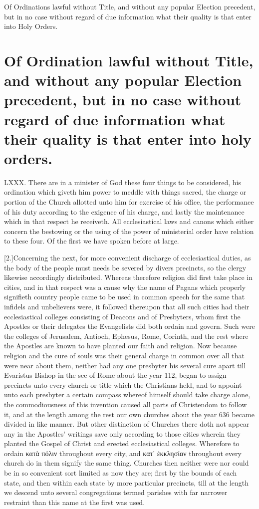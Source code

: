 Of Ordinations lawful without Title, and without any popular Election precedent, but in no case without regard of due information what their quality is that enter into Holy Orders.
\section*{Of Ordination lawful without Title, and without any popular Election precedent, but in no case without regard of due information what their quality is that enter into holy orders.}
LXXX. There are in a minister of God these four things to be considered, his ordination which giveth him power to meddle with things sacred, the charge or portion of the Church allotted unto him for exercise of his office, the performance of his duty according to the exigence of his charge, and lastly the maintenance which in that respect he receiveth. All ecclesiastical laws and canons which either concern the bestowing or the using of the power of ministerial order have relation to these four. Of the first we have spoken before at large.

[2.]Concerning the next, for more convenient discharge of ecclesiastical duties, as the body of the people must needs be severed by divers precincts, so the clergy likewise accordingly distributed. Whereas therefore religion did first take place in cities, and in that respect was a cause why the name of Pagans which properly signifieth country people came to be used in common speech for the same that infidels and unbelievers were, it followed thereupon that all such cities had their ecclesiastical colleges consisting of Deacons and of Presbyters, whom first the Apostles or their delegates the Evangelists did both ordain and govern. Such were the colleges of Jerusalem, Antioch, Ephesus, Rome, Corinth, and the rest where the Apostles are known to have planted  our faith and religion.
 Now because religion and the cure of souls was their general charge in common over all that were near about them, neither had any one presbyter his several cure apart till Evaristus Bishop in the see of Rome about the year 112, began to assign precincts unto every church or title which the Christians held, and to appoint unto each presbyter a certain compass whereof himself should take charge alone, the commodiousness of this invention caused all parts of Christendom to follow it, and at the length among the rest our own churches about the year 636 became divided in like manner. But other distinction of Churches there doth not appear any in the Apostles’ writings save only according to those cities wherein they planted the Gospel of Christ and erected ecclesiastical colleges. Wherefore to ordain κατὰ πόλιν throughout every city, and κατ’ ἐκκλησίαν throughout every church do in them signify the same thing. Churches then neither were nor could be in so convenient sort limited as now they are; first by the bounds of each state, and then within each state by more particular precincts, till at the length we descend unto several congregations termed parishes with far narrower restraint than this name at the first was used.

